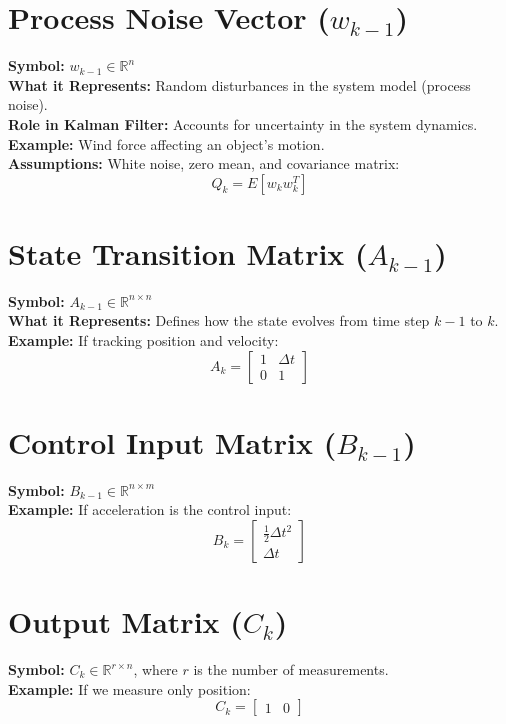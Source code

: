 \documentclass{article}
\begin{document}
\section{Process Noise Vector ($w_{k-1}$)}
\textbf{Symbol:} $w_{k-1} \in \mathbb{R}^{n}$  \\
\textbf{What it Represents:} Random disturbances in the system model (process noise).  \\
\textbf{Role in Kalman Filter:} Accounts for uncertainty in the system dynamics.  \\
\textbf{Example:} Wind force affecting an object's motion.  \\
\textbf{Assumptions:} White noise, zero mean, and covariance matrix:
\[
    Q_k = E[w_k w_k^T]
\]

\section{State Transition Matrix ($A_{k-1}$)}
\textbf{Symbol:} $A_{k-1} \in \mathbb{R}^{n \times n}$  \\
\textbf{What it Represents:} Defines how the state evolves from time step $k-1$ to $k$.  \\
\textbf{Example:} If tracking position and velocity:
\[
    A_k = \begin{bmatrix} 1 & \Delta t \\ 0 & 1 \end{bmatrix}
\]

\section{Control Input Matrix ($B_{k-1}$)}
\textbf{Symbol:} $B_{k-1} \in \mathbb{R}^{n \times m}$  \\
\textbf{Example:} If acceleration is the control input:
\[
    B_k = \begin{bmatrix} \frac{1}{2} \Delta t^2 \\ \Delta t \end{bmatrix}
\]

\section{Output Matrix ($C_k$)}
\textbf{Symbol:} $C_k \in \mathbb{R}^{r \times n}$, where $r$ is the number of measurements.  \\
\textbf{Example:} If we measure only position:
\[
    C_k = \begin{bmatrix} 1 & 0 \end{bmatrix}
\]
\end{document}
